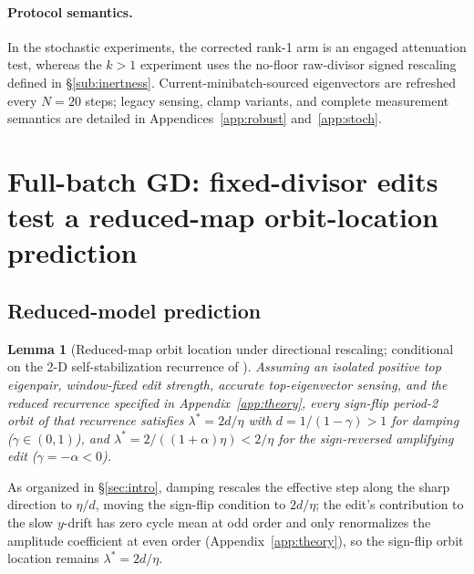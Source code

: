 \documentclass{article}
\theoremstyle{plain}
\newtheorem{lemma}{Lemma}
\theoremstyle{definition}
\theoremstyle{remark}
\begin{document}
\paragraph{Protocol semantics.}
In the stochastic experiments, the corrected rank-1 arm is an engaged
attenuation test, whereas the $k{>}1$ experiment uses the no-floor
raw-divisor signed rescaling defined in \S\ref{sub:inertness}.
Current-minibatch-sourced eigenvectors are refreshed every $N{=}20$
steps; legacy sensing, clamp variants, and complete measurement
semantics are detailed in Appendices~\ref{app:robust}
and~\ref{app:stoch}.

\section{Full-batch GD: fixed-divisor edits test a reduced-map orbit-location prediction}
\label{sec:control}

\subsection{Reduced-model prediction}
\label{sec:theory}
\begin{lemma}[Reduced-map orbit location under directional rescaling; conditional on the 2-D self-stabilization recurrence of \citet{damian2023selfstab}]
\label{prop:boundary}
Assuming an isolated positive top eigenpair, window-fixed edit
strength, accurate top-eigenvector sensing, and the reduced
recurrence specified in Appendix~\ref{app:theory}, every sign-flip
period-2 orbit of that recurrence satisfies $\lambda^{*}=2d/\eta$
with $d=1/(1-\gamma)>1$ for damping ($\gamma\in(0,1)$), and
$\lambda^{*}=2/((1+\alpha)\eta)<2/\eta$ for the sign-reversed
amplifying edit ($\gamma=-\alpha<0$).
\end{lemma}

\noindent{}

As organized in \S\ref{sec:intro}, damping rescales the effective
step along the sharp direction to $\eta/d$, moving the sign-flip
condition to $2d/\eta$; the edit's
contribution to the slow $y$-drift has zero cycle mean at odd order
and only renormalizes the amplitude coefficient at even order
(Appendix~\ref{app:theory}), so the sign-flip orbit location remains
$\lambda^{*}=2d/\eta$.
\end{document}
